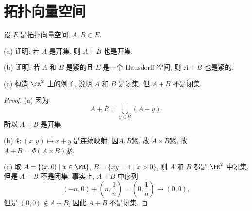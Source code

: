 \chapter{拓扑向量空间}
\thispagestyle{empty}


\setcounter{exer}{1}
\begin{exercise}
    设 $E$ 是拓扑向量空间, $A,B\subset E$.

    (a) 证明: 若 $A$ 是开集, 则 $A+B$ 也是开集.

    (b) 证明: 若 $A$ 和 $B$ 是紧的且 $E$ 是一个 Hausdorff 空间, 则 $A+B$ 也是紧的.

    (c) 构造 $\FR^2$ 上的例子, 说明 $A$ 和 $B$ 是闭集, 但 $A+B$ 不是闭集.
\end{exercise}

\begin{proof}
    (a) 因为
    \[A+B=\bigcup_{y\in B}(A+y).\]
    所以 $A+B$ 是开集.

    (b) $\varPhi:(x,y)\mapsto x+y$ 是连续映射, 因$A,B$紧, 故 $A\times B$紧, 故 $A+B=\varPhi(A\times B)$紧.

    (c) 取 $A=\{(x,0)\mid x\in\FR\}$, $B=\{xy=1\mid x>0\}$,
    则 $A$ 和 $B$ 都是 $\FR^2$ 中闭集, 但是 $A+B$ 不是闭集.
    事实上, $A+B$ 中序列
    \[(-n,0)+(n,\frac{1}{n})=(0,\frac{1}{n})\to (0,0),\]
    但是 $(0,0)\notin A+B$, 因此 $A+B$ 不是闭集.
\end{proof}



